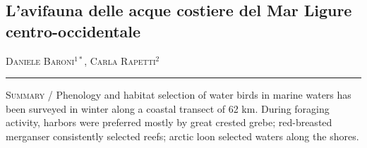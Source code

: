 \setcounter{figure}{0}
\setcounter{table}{0}

\begin{adjustwidth}{-3.5cm}{0cm}
\pagestyle{CIOpage}
\chapter*[L{\textquoteright}avifauna delle acque costiere]{L{\textquoteright}avifauna delle acque costiere del Mar Ligure centro-occidentale}

\textsc{Daniele Baroni}$^{1*}$, \textsc{Carla Rapetti}$^{2}$\\

 
\noindent\color{MUSEBLUE}\rule{27cm}{2pt}
\vspace{1cm}
\end{adjustwidth}



{\small
\noindent \textsc{\color{MUSEBLUE} Summary} / Phenology and habitat selection of water birds in marine waters has been
surveyed in winter along a coastal transect of 62 km. During foraging
activity, harbors were preferred mostly by great crested grebe;
red-breasted merganser consistently selected reefs; arctic loon
selected waters along the shores.
}
\vspace{1cm}
